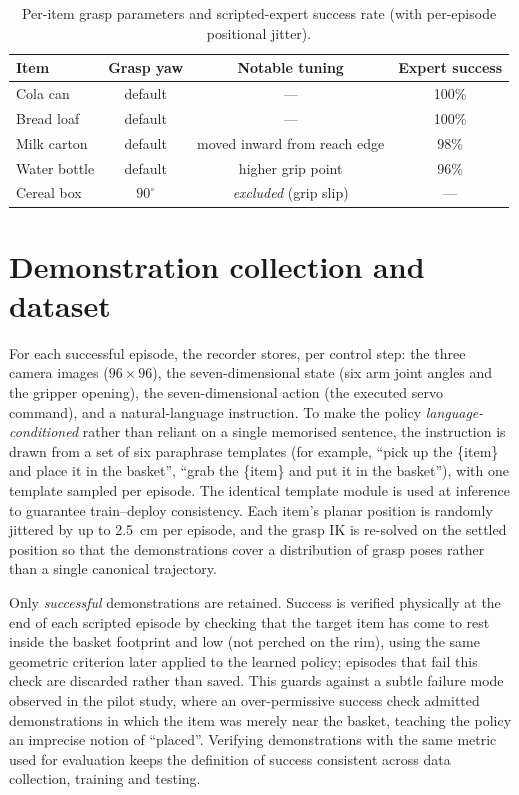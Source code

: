 \begin{table}[ht]
\caption{Per-item grasp parameters and scripted-expert success rate (with
per-episode positional jitter).}
\begin{center}
\begin{tabular}{lccc}
\toprule
Item & Grasp yaw & Notable tuning & Expert success \\
\midrule
Cola can     & default & ---                         & 100\% \\
Bread loaf   & default & ---                         & 100\% \\
Milk carton  & default & moved inward from reach edge & 98\% \\
Water bottle & default & higher grip point           & 96\% \\
Cereal box   & $90^\circ$ & \emph{excluded} (grip slip) & --- \\
\bottomrule
\end{tabular}
\end{center}
\label{tab:grasptune}
\end{table}

\section{Demonstration collection and dataset}
\label{sec:m-data}
For each successful episode, the recorder stores, per control step: the three
camera images ($96\times96$), the seven-dimensional state (six arm joint angles and
the gripper opening), the seven-dimensional action (the executed servo command),
and a natural-language instruction. To make the policy \emph{language-conditioned}
rather than reliant on a single memorised sentence, the instruction is drawn from a
set of six paraphrase templates (for example, ``pick up the
\{item\} and place it in the basket'', ``grab the \{item\} and put it in the
basket''), with one template sampled per episode. The identical template module is
used at inference to guarantee train--deploy consistency. Each item's planar
position is randomly jittered by up to \SI{2.5}{cm} per episode, and the grasp IK is
re-solved on the settled position so that the demonstrations cover a distribution
of grasp poses rather than a single canonical trajectory.

Only \emph{successful} demonstrations are retained. Success is verified physically at
the end of each scripted episode by checking that the target item has come to rest
inside the basket footprint and low (not perched on the rim), using the same
geometric criterion later applied to the learned policy; episodes that fail this check
are discarded rather than saved. This guards against a subtle failure mode observed in
the pilot study, where an over-permissive success check admitted demonstrations in
which the item was merely near the basket, teaching the policy an imprecise notion of
``placed''. Verifying demonstrations with the same metric used for evaluation keeps
the definition of success consistent across data collection, training and testing.

